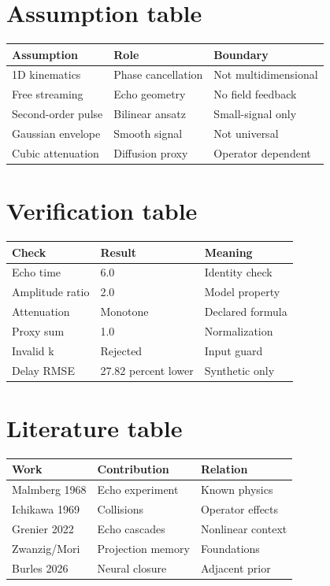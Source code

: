 \documentclass[11pt,a4paper]{article}
\begin{document}
\section{Assumption table}
\begin{tabular}{lll}\toprule Assumption & Role & Boundary\\\midrule
1D kinematics & Phase cancellation & Not multidimensional\\
Free streaming & Echo geometry & No field feedback\\
Second-order pulse & Bilinear ansatz & Small-signal only\\
Gaussian envelope & Smooth signal & Not universal\\
Cubic attenuation & Diffusion proxy & Operator dependent\\\bottomrule
\end{tabular}
\newpage
\section{Verification table}
\begin{tabular}{lll}\toprule Check & Result & Meaning\\\midrule
Echo time & 6.0 & Identity check\\
Amplitude ratio & 2.0 & Model property\\
Attenuation & Monotone & Declared formula\\
Proxy sum & 1.0 & Normalization\\
Invalid k & Rejected & Input guard\\
Delay RMSE & 27.82 percent lower & Synthetic only\\\bottomrule
\end{tabular}
\newpage
\section{Literature table}
\begin{tabular}{lll}\toprule Work & Contribution & Relation\\\midrule
Malmberg 1968 & Echo experiment & Known physics\\
Ichikawa 1969 & Collisions & Operator effects\\
Grenier 2022 & Echo cascades & Nonlinear context\\
Zwanzig/Mori & Projection memory & Foundations\\
Burles 2026 & Neural closure & Adjacent prior\\\bottomrule
\end{tabular}
\newpage
\end{document}
